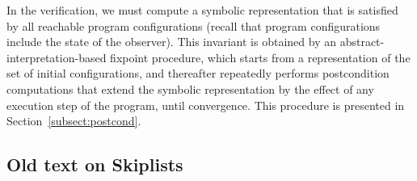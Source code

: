 In the  verification, we must compute a symbolic representation
that is satisfied by all reachable program configurations (recall that
program configurations include the state of the observer).
This invariant is obtained by an abstract-interpretation-based
fixpoint procedure, which starts
from a representation of the set of initial configurations, and
thereafter repeatedly performs
postcondition computations that extend the
symbolic representation by the effect of any execution step of the program,
until convergence.
This procedure is presented in Section~\ref{subsect:postcond}.



\subsection{Old text on Skiplists}

